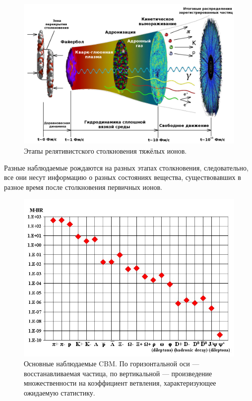 \begin{figure}[H]
\includegraphics[width=1.0\textwidth]{pictures/little_bang_rus2.png}
\caption{Этапы релятивистского столкновения тяжёлых ионов.}
\label{fig:LittleBang}
\end{figure}

Разные наблюдаемые рождаются на разных этапах столкновения, следовательно, все они несут информацию о разных состояниях вещества, существовавших в разное время после столкновения первичных ионов.


\begin{figure}[H]
\includegraphics[width=1.0\textwidth]{pictures/CBM_observables.png}
\caption{Основные наблюдаемые CBM. По горизонтальной оси --- восстанавливаемая частица, по вертикальной --- произведение множественности на коэффициент ветвления, характеризующее ожидаемую статистику.}
\label{fig:CBMParticlesYields}
\end{figure}

